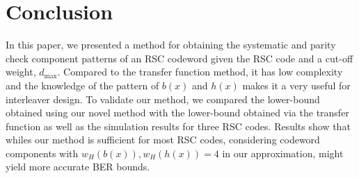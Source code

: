 \section{Conclusion}
\label{sec6}
 



In this paper, we presented a method for  obtaining the systematic and parity check component patterns of an RSC codeword given the RSC code and a cut-off weight, $d_{\text{max}}$.
Compared to the transfer function method, it has low complexity and the knowledge of the pattern of $b(x)$ and $h(x)$ makes it a very useful for interleaver design. To validate our method, we compared the lower-bound obtained using our novel method with the lower-bound obtained via the transfer function as well as the simulation results for three RSC codes. Results show that whiles our method is sufficient for most RSC codes, considering codeword components with $w_H(b(x)), w_H(h(x)) =4$ in our approximation, might yield more accurate BER bounds.
